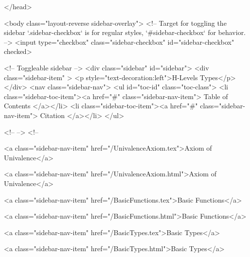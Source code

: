   
</head>




  <body class="layout-reverse sidebar-overlay">
    <!-- Target for toggling the sidebar `.sidebar-checkbox` is for regular
     styles, `#sidebar-checkbox` for behavior. -->
<input type="checkbox" class="sidebar-checkbox" id="sidebar-checkbox" checked>

<!-- Toggleable sidebar -->
<div class="sidebar" id="sidebar">
  <div class="sidebar-item" >
    <p style="text-decoration:left">H-Levels Types</p>
  </div>
  <nav class="sidebar-nav">
    <ul id="toc-id" class="toc-class">
  <li class="sidebar-toc-item"><a href="#" class="sidebar-nav-item"> Table of Contents </a></li>
  <li class="sidebar-toc-item"><a href="#" class="sidebar-nav-item"> Citation </a></li>
</ul>


    <!--  -->
    <!-- 
      
    
      
    
      
    
      
    
      
        
      
    
      
        
          <a class="sidebar-nav-item" href="/UnivalenceAxiom.tex">Axiom of Univalence</a>
        
      
    
      
        
          <a class="sidebar-nav-item" href="/UnivalenceAxiom.html">Axiom of Univalence</a>
        
      
    
      
        
          <a class="sidebar-nav-item" href="/BasicFunctions.tex">Basic Functions</a>
        
      
    
      
        
          <a class="sidebar-nav-item" href="/BasicFunctions.html">Basic Functions</a>
        
      
    
      
        
          <a class="sidebar-nav-item" href="/BasicTypes.tex">Basic Types</a>
        
      
    
      
        
          <a class="sidebar-nav-item" href="/BasicTypes.html">Basic Types</a>
        
      
    
